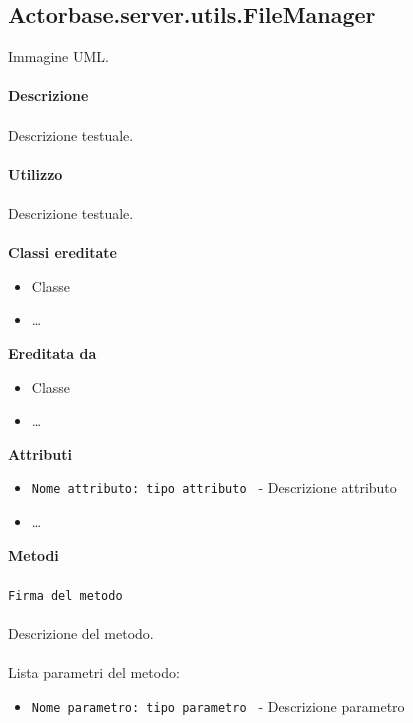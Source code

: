 \documentclass[a4paper]{article}
\begin{document}
	\subsection{Actorbase.server.utils.FileManager}
		Immagine UML.
		\\ \\
		\textbf{Descrizione}
			\\ \\
			Descrizione testuale.
			\\ \\
		\textbf{Utilizzo}
			\\ \\
			Descrizione testuale.
			\\ \\
		\textbf{Classi ereditate}
			\begin{itemize}
				\item Classe
				\item \dots
			\end{itemize}
		\textbf{Ereditata da}
			\begin{itemize}
				\item Classe
				\item \dots
			\end{itemize}
		\textbf{Attributi}
			\begin{itemize}
				\item \texttt{Nome attributo: tipo attributo } - Descrizione attributo
				\item \dots
			\end{itemize}
		\textbf{Metodi}
			\\ \\
			\texttt{Firma del metodo}
			\\ \\
			Descrizione del metodo.
			\\ \\
			Lista parametri del metodo:
			\begin{itemize}
				\item \texttt{Nome parametro: tipo parametro } - Descrizione parametro
			\end{itemize}
			
\end{document}
